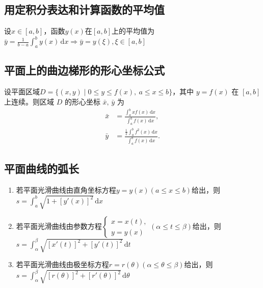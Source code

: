 \documentclass[../book.tex]{subfiles}
\begin{document}
    \subsection{用定积分表达和计算函数的平均值}

    设$x \in [a, b]$，函数$y(x)$在$[a, b]$上的平均值为$\bar{y} = \displaystyle\frac{1}{b - a}\int_a^b y(x)\,\mathrm{d}x \Rightarrow \bar{y} = y(\xi), \xi \in [a, b]$

    \subsection{平面上的曲边梯形的形心坐标公式}

    设平面区域$D = \{(x, y) \mid 0 \le y \le f(x),\ a \le x \le b\}$，其中 $y = f(x)$ 在 $[a,b]$ 上连续。则区域 $D$ 的形心坐标 $\bar{x},\,\bar{y}$ 为
    \[
        \begin{aligned}
            \bar{x}
            &=
            \frac{\displaystyle\int_a^b x f(x)\,\mathrm{d}x}
            {\displaystyle\int_a^b f(x)\,\mathrm{d}x},
            \\[8pt]
            \bar{y}
            &=
            \frac{\displaystyle\frac{1}{2}\int_a^b f^2(x)\,\mathrm{d}x}
            {\displaystyle\int_a^b f(x)\,\mathrm{d}x}.
        \end{aligned}
    \]

    \subsection{平面曲线的弧长}

    {}

    \begin{enumerate}
        \item 若平面光滑曲线由直角坐标方程$y = y(x)(a \leq x \leq b)$给出，则$s = \displaystyle\int_a^b \sqrt {1 + [y'(x)]^2}\,\mathrm{d}x$
        \item 若平面光滑曲线由参数方程$\begin{cases}
                                           x = x(t), \\
                                           y = y(x)
        \end{cases}(\alpha \leq t \leq \beta)$给出，则$s = \displaystyle\int_{\alpha}^{\beta} \sqrt {[x'(t)]^2 + [y'(t)]^2}\,\mathrm{d}t$
        \item 若平面光滑曲线由极坐标方程$r = r(\theta)(\alpha \leq \theta \leq \beta)$给出，则$s = \displaystyle\int_{\alpha}^{\beta} \sqrt {[r(\theta)]^2 + [r'(\theta)]^2}\,\mathrm{d}\theta$
    \end{enumerate}
\end{document}
